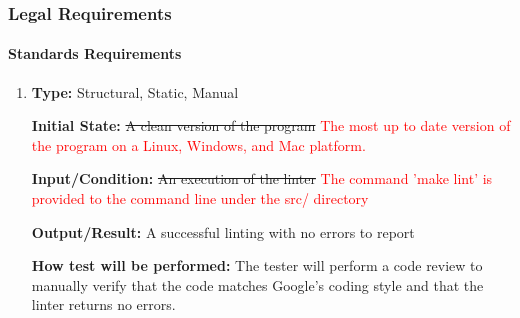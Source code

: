 \documentclass[12pt, titlepage]{article}
\begin{document}
\subsubsection{Legal Requirements}
		
\paragraph{Standards Requirements}

\begin{enumerate}[label=NFR-SR\arabic*:, wide=0pt, leftmargin=*]

\item \phantom{empty}

\textbf{Type:} Structural, Static, Manual
					
\textbf{Initial State:} \sout{A clean version of the program}
\textcolor{red}{The most up to date version of the program on a Linux, Windows, and Mac platform.}
					
\textbf{Input/Condition:} \sout{An execution of the linter}
\textcolor{red}{The command 'make lint' is provided to the command line under the src/ directory}
					
\textbf{Output/Result:} A successful linting with no errors to report
					
\textbf{How test will be performed:} The tester will perform a code review to manually verify that the code matches Google's coding style and that the linter returns no errors.

\end{enumerate}
\newpage
\end{document}
